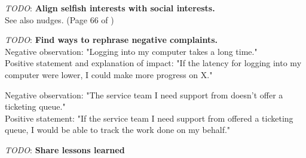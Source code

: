 \textit{TODO}: \textbf{Align selfish interests with social interests.}\\
See also nudges. 
(Page 66 of \cite{2012_Schneier})

\textit{TODO}: \textbf{Find ways to rephrase negative complaints.}\\
Negative observation: "Logging into my computer takes a long time."\\
Positive statement and explanation of impact: "If the latency for logging into my computer were lower, I could make more progress on X."


Negative observation: "The service team I need support from doesn't offer a ticketing queue."\\
Positive statement: "If the service team I need support from offered a ticketing queue, I would be able to track the work done on my behalf."

\textit{TODO}: \textbf{Share lessons learned}\\